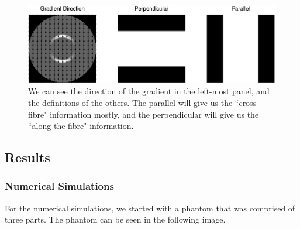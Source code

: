 \documentclass[11 pt]{article}
\begin{document}
    \begin{figure}[h] 

      \centering
      \vspace{0pt}
      \setlength\fboxsep{0pt}
      \setlength\fboxrule{0.5pt}
      \includegraphics[trim = {0mm 0mm 0mm 0mm},clip,scale = 0.8] {Figs/numericalSims/GradDir01.eps}
      \caption{We can see the direction of the gradient in the left-most panel, and the definitions of the others. The parallel will give us the ``cross-fibre" information mostly, and the perpendicular will give us the ``along the fibre" information.}
      \label{fig:GradDir}

      \end{figure}

  \subsection{Results}
  
    \subsubsection{Numerical Simulations}
    
      For the numerical simulations, we started with a phantom that was comprised of three parts. The phantom can be seen in the following image.
    
\end{document}
